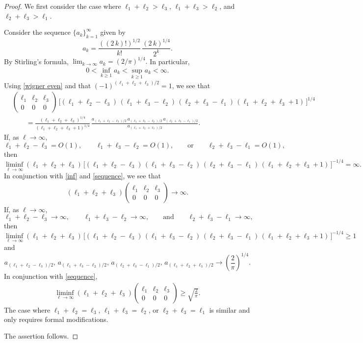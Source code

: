 \documentclass[10pt,a4paper]{amsart}
\begin{document}
\begin{proof}
	We first consider the case where $\ell_1+\ell_2>\ell_3$, $\ell_1+\ell_3>\ell_2$, and $\ell_2+\ell_3>\ell_1$.
	
	Consider the sequence $\{a_k\}_{k=1}^\infty$ given by
	$$
	a_k= \frac{((2\,k)!)^{1/2}}{k!}\,\frac{(2\,k)^{1/4}}{2^k}.
	$$	
	By Stirling's formula, 
	$
	\lim_{k\to\infty}	a_k=(2/\pi)^{1/4}.
	$
	In particular, 
	\begin{align} \label{inf} 
		0<	\inf_{k\geq 1}a_k<\sup_{k\geq 1} a_k<\infty.
	\end{align}
	Using \eqref{wigner even} and that $(-1)^{(\ell_1+\ell_2+\ell_3)/2}=1$, we see that
	\begin{equation}  \label{sequence}
		\begin{aligned} 
			&\begin{pmatrix} \ell_1 & \ell_2 &\ell_3 \\
				0& 0 & 0
			\end{pmatrix} \,\bigg[(\ell_1+\ell_2-\ell_3)\,(\ell_1+\ell_3-\ell_2)\,(\ell_2+\ell_3-\ell_1)\,(\ell_1+\ell_2+\ell_3+1)\,\bigg]^{1/4} \\
			&\qquad =\frac{(\ell_1+\ell_2+\ell_3)^{1/4}}{(\ell_1+\ell_2+\ell_3+1)^{1/4}}\,\frac{a_{(\ell_1+\ell_2-\ell_3)/2}\,a_{(\ell_1+\ell_3-\ell_2)/2}\,a_{(\ell_2+\ell_3-\ell_1)/2}}{a_{(\ell_1+\ell_2+\ell_3)/2}}.
		\end{aligned}
	\end{equation} \indent 
	If, as $\ell\to\infty$, 
	$$
	\ell_1+\ell_2-\ell_3=O(1),\qquad \ell_1+\ell_3-\ell_2=O(1),\qquad\text{or}\qquad \ell_2+\ell_3-\ell_1=O(1),
	$$ then $$
	\liminf_{\ell\to\infty} (\ell_1+\ell_2+\ell_3)\,\big[(\ell_1+\ell_2-\ell_3)\,(\ell_1+\ell_3-\ell_2)\,(\ell_2+\ell_3-\ell_1)\,(\ell_1+\ell_2+\ell_3+1)\,\big]^{-1/4}=\infty.
	$$
	In conjunction with \eqref{inf} and \eqref{sequence}, we see that
	\begin{align*} 
		(\ell_1+\ell_2+\ell_3)\begin{pmatrix} \ell_1 & \ell_2 &\ell_3 \\
			0& 0 & 0
		\end{pmatrix}\to\infty.
	\end{align*} 
	\indent If, as $\ell\to\infty$, 
	$$
	\ell_1+\ell_2-\ell_3\to\infty,\qquad \ell_1+\ell_3-\ell_2\to\infty,\qquad\text{and}\qquad \ell_2+\ell_3-\ell_1\to\infty,
	$$ then 
	$$
	\liminf_{\ell\to\infty} (\ell_1+\ell_2+\ell_3)\,\big[(\ell_1+\ell_2-\ell_3)\,(\ell_1+\ell_3-\ell_2)\,(\ell_2+\ell_3-\ell_1)\,(\ell_1+\ell_2+\ell_3+1)\,\big]^{-1/4}\geq 1
	$$
	and 
	$$
	a_{(\ell_1+\ell_2-\ell_3)/2},\,a_{(\ell_1+\ell_3-\ell_2)/2},\,a_{(\ell_2+\ell_3-\ell_1)/2},\,a_{(\ell_1+\ell_2+\ell_3)/2}\to\left(\frac{2}{\pi}\right)^{1/4}. 
	$$ 
	In conjunction with \eqref{sequence},
	\begin{align*} 
		\liminf_{\ell\to\infty} (\ell_1+\ell_2+\ell_3)\begin{pmatrix} \ell_1 & \ell_2 &\ell_3 \\
			0& 0 & 0
		\end{pmatrix}\geq \sqrt{\frac{2}{\pi}}.
	\end{align*} 
\indent The case where $\ell_1+\ell_2=\ell_3$, $\ell_1+\ell_3=\ell_2$, or $\ell_2+\ell_3=\ell_1$ is similar and only requires formal modifications.

	The assertion follows.
\end{proof}
\end{document}
